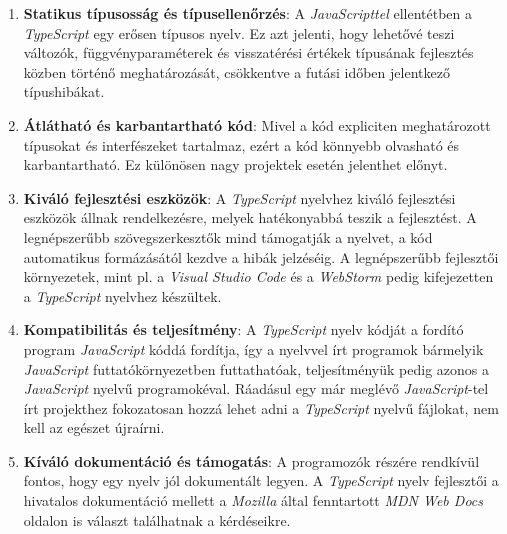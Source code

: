\begin{enumerate}
	\item \textbf{Statikus típusosság és típusellenőrzés}:
	      A \textit{JavaScripttel} ellentétben a \textit{TypeScript} egy erősen
	      típusos nyelv. Ez azt jelenti, hogy lehetővé teszi változók,
	      függvényparaméterek és visszatérési értékek típusának fejlesztés közben
	      történő meghatározását, csökkentve a futási időben jelentkező
	      típushibákat.

	\item \textbf{Átlátható és karbantartható kód}:
	      Mivel a kód expliciten meghatározott típusokat és interfészeket
	      tartalmaz, ezért a kód könnyebb olvasható és karbantartható.
	      Ez különösen nagy projektek esetén jelenthet előnyt.

	\item \textbf{Kiváló fejlesztési eszközök}:
	      A \textit{TypeScript} nyelvhez kiváló fejlesztési eszközök állnak
	      rendelkezésre, melyek hatékonyabbá teszik a fejlesztést. A
	      legnépszerűbb szövegszerkesztők mind támogatják a nyelvet, a kód
	      automatikus formázásától kezdve a hibák jelzéséig. A legnépszerűbb
	      fejlesztői környezetek, mint pl. a \textit{Visual Studio Code} és
	      a \textit{WebStorm} pedig kifejezetten a \textit{TypeScript}
	      nyelvhez készültek.

	\item \textbf{Kompatibilitás és teljesítmény}:
	      A \textit{TypeScript} nyelv kódját a fordító program \textit{JavaScript}
	      kóddá fordítja, így a nyelvvel írt programok bármelyik
	      \textit{JavaScript} futtatókörnyezetben futtathatóak, teljesítményük
	      pedig azonos a \textit{JavaScript} nyelvű programokéval. Ráadásul egy
	      már meglévő \textit{JavaScript}-tel írt projekthez fokozatosan hozzá
	      lehet adni a \textit{TypeScript} nyelvű fájlokat, nem kell az egészet
	      újraírni.

	\item \textbf{Kíváló dokumentáció és támogatás}:
	      A programozók részére rendkívül fontos, hogy egy nyelv jól dokumentált
	      legyen. A \textit{TypeScript} nyelv fejlesztői a hivatalos dokumentáció
	      \cite{TS_Microsoft} mellett a \textit{Mozilla} által fenntartott
	      \textit{MDN Web Docs} \cite{JS_Mozilla} oldalon is választ találhatnak
	      a kérdéseikre.
\end{enumerate}

